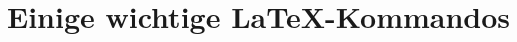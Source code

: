 % 
%
\seAppendix{}
\chapter{Einige wichtige \LaTeX{}-Kommandos}

%
%
%
%
\newpage
\sePrintGlossary{}


%
%
\sePrintBibliography{}




%
%


%
%
%

%
% 


%
%
%
\seEhrenwoertlicheErklaerung[\seThemaWaArbeit{}]


